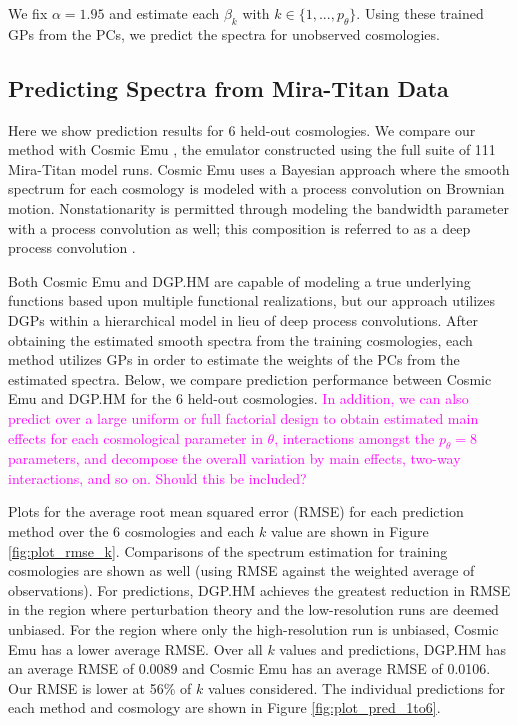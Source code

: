 \documentclass[11pt]{article}
\begin{document}
We fix $\alpha=1.95$ and estimate each $\beta_k$ with $k \in \{1,...,p_\theta\}$. Using these trained GPs from the PCs, we predict the spectra for unobserved cosmologies.

\subsection{Predicting Spectra from Mira-Titan Data}
\label{subsec:mira_pred}

Here we show prediction results for 6 held-out cosmologies. We compare our method with Cosmic Emu \citep{moran2023mira}, the emulator constructed using the full suite of 111 Mira-Titan model runs. Cosmic Emu uses a Bayesian approach where the smooth spectrum for each cosmology is modeled with a process convolution on Brownian motion. Nonstationarity is permitted through modeling the bandwidth parameter with a process convolution as well; this composition is referred to as a deep process convolution \citep{moran2024dpc}.

Both Cosmic Emu and DGP.HM are capable of modeling a true underlying functions based upon multiple functional realizations, but our approach utilizes DGPs within a hierarchical model in lieu of deep process convolutions. After obtaining the estimated smooth spectra from the training cosmologies, each method utilizes GPs in order to estimate the weights of the PCs from the estimated spectra. Below, we compare prediction performance between Cosmic Emu and DGP.HM for the 6 held-out cosmologies. \textcolor{magenta}{In addition, we can also predict over a large uniform or full factorial design to obtain estimated main effects for each cosmological parameter in $\theta$, interactions amongst the $p_\theta=8$ parameters, and decompose the overall variation by main effects, two-way interactions, and so on. Should this be included?}

Plots for the average root mean squared error (RMSE) for each prediction method over the 6 cosmologies and each $k$ value are shown in Figure \ref{fig:plot_rmse_k}. Comparisons of the spectrum estimation for training cosmologies are shown as well (using RMSE against the weighted average of observations). For predictions, DGP.HM achieves the greatest reduction in RMSE in the region where perturbation theory and the low-resolution runs are deemed unbiased. For the region where only the high-resolution run is unbiased, Cosmic Emu has a lower average RMSE. Over all $k$ values and predictions, DGP.HM has an average RMSE of 0.0089 and Cosmic Emu has an average RMSE of 0.0106. Our RMSE is lower at 56\% of $k$ values considered. The individual predictions for each method and cosmology are shown in Figure \ref{fig:plot_pred_1to6}.
\end{document}
